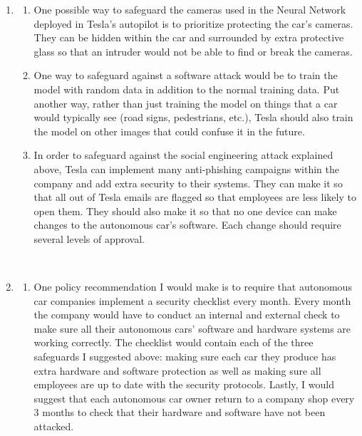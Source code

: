 \documentclass[submit]{harvardml}
\begin{document}
\begin{enumerate}
\begin{enumerate}
    \end{enumerate}
    \\
    \item
    \begin{enumerate}
        \item One possible way to safeguard the cameras used in the Neural Network deployed in Tesla's autopilot is to prioritize protecting the car's cameras. They can be hidden within the car and surrounded by extra protective glass so that an intruder would not be able to find or break the cameras. \\
        \item One way to safeguard against a software attack would be to train the model with random data in addition to the normal training data. Put another way, rather than just training the model on things that a car would typically see (road signs, pedestrians, etc.), Tesla should also train the model on other images that could confuse it in the future.\\
        \item In order to safeguard against the social engineering attack explained above, Tesla can implement many anti-phishing campaigns within the company and add extra security to their systems. They can make it so that all out of Tesla emails are flagged so that employees are less likely to open them. They should also make it so that no one device can make changes to the autonomous car's software. Each change should require several levels of approval.\\
    \end{enumerate}
    \\
    \item
    \begin{enumerate}
        \item One policy recommendation I would make is to require that autonomous car companies implement a security checklist every month. Every month the company would have to conduct an internal and external check to make sure all their autonomous cars' software and hardware systems are working correctly. The checklist would contain each of the three safeguards I suggested above: making sure each car they produce has extra hardware and software protection as well as making sure all employees are up to date with the security protocols. Lastly, I would suggest that each autonomous car owner return to a company shop every 3 months to check that their hardware and software have not been attacked.\\

\end{enumerate}
\end{enumerate}
\end{document}
